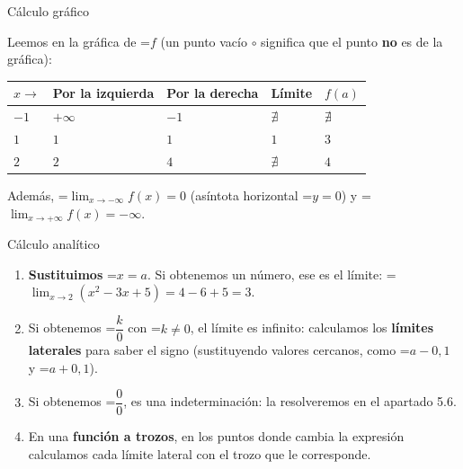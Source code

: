 \documentclass[11pt,a4paper]{article}
\newcommand{\fmm}[1]{\setbox0=\hbox{$#1$}\ifdim\wd0>\linewidth\fmdisp{#1}\else\mbox{\box0}\fi}
\newcommand{\fmdisp}[1]{\[\setbox2=\hbox{$\displaystyle #1$}\ifdim\wd2>\linewidth\resizebox{\linewidth}{!}{\box2}\else\box2\fi\]}
\begin{document}
\begin{fmex}{Cálculo gráfico}
\begin{center}\end{center}

Leemos en la gráfica de \fmm{f} (un punto vacío $\circ$ significa que el punto \textbf{no} es de la gráfica):

\begin{center}\renewcommand{\arraystretch}{1.5}\small\begin{tabularx}{\linewidth}{>{\raggedright\arraybackslash}p{3.2cm}>{\raggedright\arraybackslash}X>{\raggedright\arraybackslash}X>{\raggedright\arraybackslash}X>{\raggedright\arraybackslash}X}\toprule
\textbf{$x\to$} & \textbf{Por la izquierda} & \textbf{Por la derecha} & \textbf{Límite} & \textbf{$f(a)$}\\\midrule
$-1$ & $+\infty$ & $-1$ & $\nexists$ & $\nexists$\\[3pt]
$1$ & $1$ & $1$ & $1$ & $3$\\[3pt]
$2$ & $2$ & $4$ & $\nexists$ & $4$\\[3pt]
\bottomrule\end{tabularx}\end{center}

Además, \fmm{\displaystyle\lim_{x\to-\infty}f(x)=0} (asíntota horizontal \fmm{y=0}) y \fmm{\displaystyle\lim_{x\to+\infty}f(x)=-\infty}.
\end{fmex}

\begin{fmdef}{Cálculo analítico}
\begin{enumerate}
\item \textbf{Sustituimos} \fmm{x=a}. Si obtenemos un número, ese es el límite: \fmm{\displaystyle\lim_{x\to2}\left(x^2-3x+5\right)=4-6+5=3}.
\item Si obtenemos \fmm{\dfrac{k}{0}} con \fmm{k\neq0}, el límite es infinito: calculamos los \textbf{límites laterales} para saber el signo (sustituyendo valores cercanos, como \fmm{a-0{,}1} y \fmm{a+0{,}1}).
\item Si obtenemos \fmm{\dfrac00}, es una indeterminación: la resolveremos en el apartado 5.6.
\item En una \textbf{función a trozos}, en los puntos donde cambia la expresión calculamos cada límite lateral con el trozo que le corresponde.
\end{enumerate}
\end{fmdef}
\end{document}
